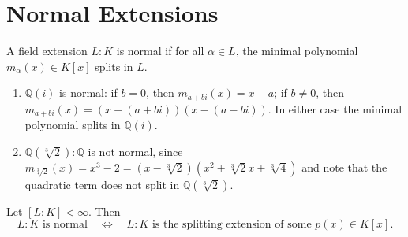 \section{Normal Extensions}
\begin{definition}
    A field extension \( L: K \) is normal if for all \( \alpha \in L \), the minimal polynomial \( m_{\alpha}(x)  \in K[x] \)  splits in \( L \).
\end{definition}

\begin{example} \label{eg-normal}
    \begin{enumerate}
        \item $\mathbb{Q}(i)$ is normal: if $b=0$, then $m_{a+bi}(x)=x-a$; if $b\neq0$, then $m_{a+bi}(x)=(x-(a+bi))(x-(a-bi))$. In either case the minimal polynomial splits in $\mathbb{Q}(i)$.
        \item $\mathbb{Q}(\sqrt[3]{2}) :\mathbb{Q} $ is not normal, since 
        $m_{\sqrt[3]{2}}(x)=x^3-2=(x-\sqrt[3]{2})(x^2+\sqrt[3]{2}x+\sqrt[3]{4})$
        and note that the quadratic term does not split in $\mathbb{Q}(\sqrt[3]{2})$.
    \end{enumerate}
    
\end{example}

\begin{theorem} \label{thm-normalsplitext}
Let $[L:K]<\infty$. Then
\[
L:K \text{ is normal}
\quad\Longleftrightarrow\quad
L:K \text{ is the splitting extension of some } p(x)\in K[x].
\]
\end{theorem}

